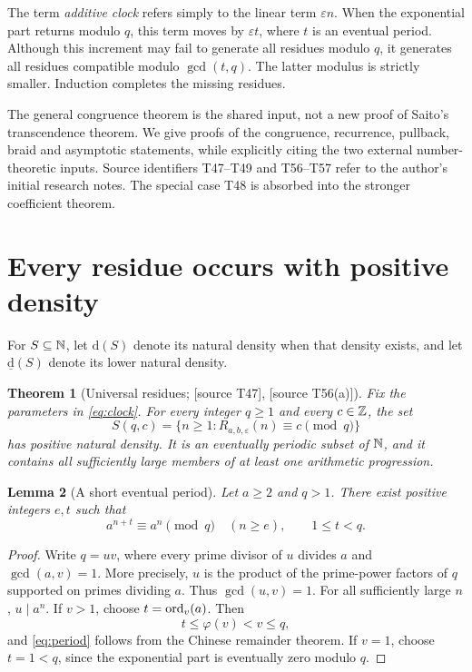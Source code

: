 \documentclass[11pt,a4paper]{article}
\newtheorem{theorem}{Theorem}[section]
\newtheorem{lemma}[theorem]{Lemma}
\theoremstyle{definition}\newtheorem{definition}[theorem]{Definition}
\theoremstyle{remark}\newtheorem{remark}[theorem]{Remark}
\newcommand{\sourceT}[1]{\textup{[source T#1]}}
\newcommand{\dens}{\mathrm d}
\begin{document}
The term \emph{additive clock} refers simply to the linear term
$\varepsilon n$. When the exponential part returns modulo $q$, this
term moves by $\varepsilon t$, where $t$ is an eventual period.
Although this increment may fail to generate all residues modulo
$q$, it generates all residues compatible modulo $\gcd(t,q)$.
The latter modulus is strictly smaller. Induction completes the
missing residues.

The general congruence theorem is the shared input, not a new proof of
Saito's transcendence theorem. We give proofs of the congruence,
recurrence, pullback, braid and asymptotic statements, while explicitly
citing the two external number-theoretic inputs. Source identifiers
T47--T49 and T56--T57 refer to the author's initial research notes.
The special case T48 is absorbed into the stronger coefficient theorem.

\section{Every residue occurs with positive density}
For $S\subseteq\mathbb N$, let $\dens(S)$ denote its natural density when
that density exists, and let $\underline{\dens}(S)$ denote its lower
natural density.

\begin{theorem}[Universal residues; \sourceT{47}, \sourceT{56(a)}]
\label{thm:residues}
Fix the parameters in \eqref{eq:clock}. For every integer $q\ge1$
and every $c\in\mathbb Z$, the set
\[
 S(q,c)=\{n\ge1:R_{a,b,\varepsilon}(n)\equiv c\pmod q\}
\]
has positive natural density. It is an eventually periodic subset of
$\mathbb N$, and it contains all sufficiently large members of at least one
arithmetic progression.
\end{theorem}

\begin{lemma}[A short eventual period]\label{lem:period}
Let $a\ge2$ and $q>1$. There exist positive integers $e,t$ such that
\begin{equation}\label{eq:period}
 a^{n+t}\equiv a^n\pmod q\quad(n\ge e),\qquad 1\le t<q.
\end{equation}
\end{lemma}
\begin{proof}
Write $q=uv$, where every prime divisor of $u$ divides $a$ and
$\gcd(a,v)=1$. More precisely, $u$ is the product of the prime-power
factors of $q$ supported on primes dividing $a$. Thus $\gcd(u,v)=1$.
For all sufficiently large $n$, $u\mid a^n$. If $v>1$, choose
$t=\operatorname{ord}_v(a)$. Then
\[
 t\le\varphi(v)<v\le q,
\]
and \eqref{eq:period} follows from the Chinese remainder theorem.
If $v=1$, choose $t=1<q$, since the exponential part is eventually
zero modulo $q$.
\end{proof}
\end{document}

